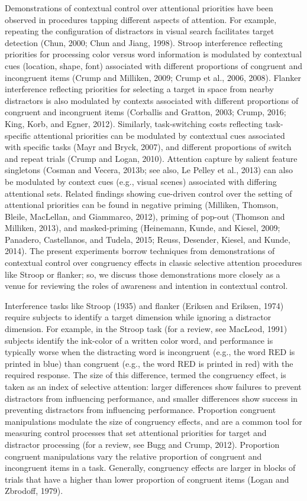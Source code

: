 \documentclass[]{DissertateCUNY}
\begin{document}
Demonstrations of contextual control over attentional priorities have
been observed in procedures tapping different aspects of attention. For
example, repeating the configuration of distractors in visual search
facilitates target detection (Chun, 2000; Chun and Jiang, 1998). Stroop
interference reflecting priorities for processing color versus word
information is modulated by contextual cues (location, shape, font)
associated with different proportions of congruent and incongruent items
(Crump and Milliken, 2009; Crump et al., 2006, 2008). Flanker
interference reflecting priorities for selecting a target in space from
nearby distractors is also modulated by contexts associated with
different proportions of congruent and incongruent items (Corballis and
Gratton, 2003; Crump, 2016; King, Korb, and Egner, 2012). Similarly,
task-switching costs reflecting task-specific attentional priorities can
be modulated by contextual cues associated with specific tasks (Mayr and
Bryck, 2007), and different proportions of switch and repeat trials
(Crump and Logan, 2010). Attention capture by salient feature singletons
(Cosman and Vecera, 2013b; see also, Le Pelley et al., 2013) can also be
modulated by context cues (e.g., visual scenes) associated with
differing attentional sets. Related findings showing cue-driven control
over the setting of attentional priorities can be found in negative
priming (Milliken, Thomson, Bleile, MacLellan, and Giammarco, 2012),
priming of pop-out (Thomson and Milliken, 2013), and masked-priming
(Heinemann, Kunde, and Kiesel, 2009; Panadero, Castellanos, and Tudela,
2015; Reuss, Desender, Kiesel, and Kunde, 2014). The present experiments
borrow techniques from demonstrations of contextual control over
congruency effects in classic selective attention procedures like Stroop
or flanker; so, we discuss those demonstrations more closely as a venue
for reviewing the roles of awareness and intention in contextual
control.

Interference tasks like Stroop (1935) and flanker (Eriksen and Eriksen,
1974) require subjects to identify a target dimension while ignoring a
distractor dimension. For example, in the Stroop task (for a review, see
MacLeod, 1991) subjects identify the ink-color of a written color word,
and performance is typically worse when the distracting word is
incongruent (e.g., the word RED is printed in blue) than congruent
(e.g., the word RED is printed in red) with the required response. The
size of this difference, termed the congruency effect, is taken as an
index of selective attention: larger differences show failures to
prevent distractors from influencing performance, and smaller
differences show success in preventing distractors from influencing
performance. Proportion congruent manipulations modulate the size of
congruency effects, and are a common tool for measuring control
processes that set attentional priorities for target and distractor
processing (for a review, see Bugg and Crump, 2012). Proportion
congruent manipulations vary the relative proportion of congruent and
incongruent items in a task. Generally, congruency effects are larger in
blocks of trials that have a higher than lower proportion of congruent
items (Logan and Zbrodoff, 1979).
\end{document}
